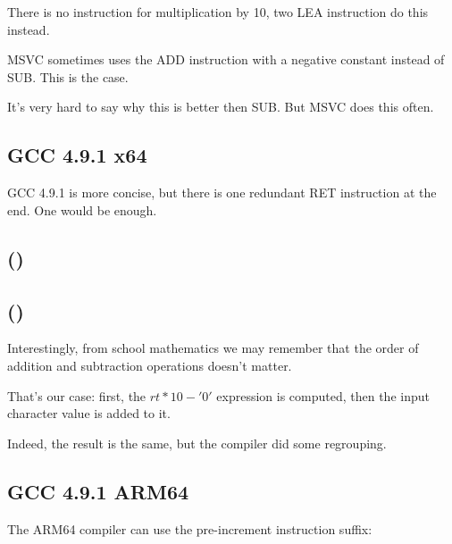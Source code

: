 There is no instruction for multiplication by 10, two LEA instruction do this instead.

MSVC sometimes uses the ADD instruction with a negative constant instead of SUB.
This is the case.

It's very hard to say why this is better then SUB.
But MSVC does this often.

\subsection{\Optimizing GCC 4.9.1 x64}

\Optimizing GCC 4.9.1 is more concise, but there is one redundant RET instruction at the end.
One would be enough.



\subsection{\OptimizingKeilVI (\ARMMode)}



\subsection{\OptimizingKeilVI (\ThumbMode)}



Interestingly, from school mathematics we may remember that the order of addition and 
subtraction operations doesn't matter.

That's our case: first, the $rt*10 - '0'$ expression is computed, then the input character value 
is added to it.

Indeed, the result is the same, but the compiler did some regrouping.

\subsection{\Optimizing GCC 4.9.1 ARM64}

The ARM64 compiler can use the pre-increment instruction suffix:



